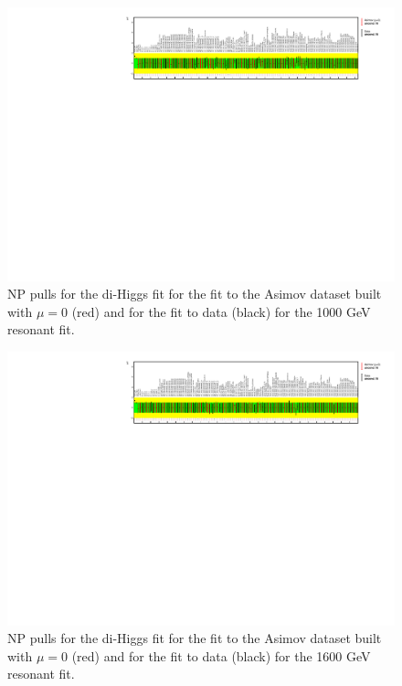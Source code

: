 \begin{figure}
\centering
\includegraphics[angle=270]{figures/results/HH/LepHad/NP_allExceptGammas_2HDM1000.pdf}
\caption{NP pulls for the di-Higgs \lephad fit for the fit to the Asimov dataset built with $\mu=0$ (red) and for the fit to data (black) for the 1000 GeV resonant fit.}
\label{fig:LepHadPostfitNPPulls2HDM1000}
\end{figure}

\begin{figure}
\centering
\includegraphics[angle=270]{figures/results/HH/LepHad/NP_allExceptGammas_2HDM1600.pdf}
\caption{NP pulls for the di-Higgs \lephad fit for the fit to the Asimov dataset built with $\mu=0$ (red) and for the fit to data (black) for the 1600 GeV resonant fit.}
\label{fig:LepHadPostfitNPPulls2HDM1600}
\end{figure}

